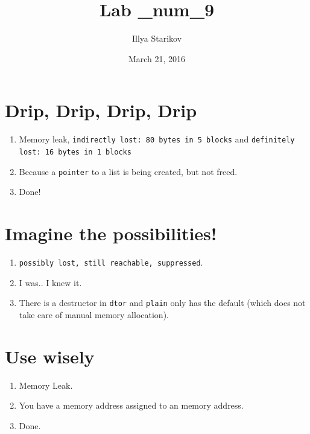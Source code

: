\documentclass{article}
\title{Lab \_num_9}
\author{Illya Starikov}
\date{March 21, 2016}
\begin{document}
\maketitle

\section{Drip, Drip, Drip, Drip}
\begin{enumerate}
    \item Memory leak, \texttt{indirectly lost: 80 bytes in 5 blocks} and \texttt{definitely lost: 16 bytes in 1 blocks}
    \item Because a \texttt{pointer} to a list is being created, but not freed.
    \item Done!
\end{enumerate}

\section{Imagine the possibilities!}
\begin{enumerate}
    \item \texttt{possibly lost, still reachable, suppressed}.
    \item I was.. I knew it.
    \item There is a destructor in \texttt{dtor} and \texttt{plain} only has the default (which does not take care of manual memory allocation).
\end{enumerate}

\section{Use wisely}
\begin{enumerate}
    \item Memory Leak.
    \item You have a memory address assigned to an memory address.
    \item Done.
\end{enumerate}
\end{document}

